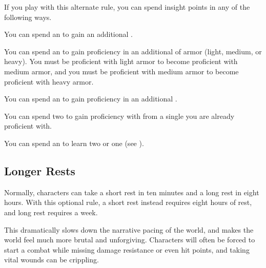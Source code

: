        If you play with this alternate rule, you can spend insight points in any of the following ways.
        \begin{raggeditemize}
            \item You can spend an  to gain an additional .
            \item You can spend an  to gain proficiency in an additional  of armor (light, medium, or heavy).
                You must be proficient with light armor to become proficient with medium armor, and you must be proficient with medium armor to become proficient with heavy armor.
            \item You can spend an  to gain proficiency in an additional .
            \item You can spend two  to gain proficiency with  from a single  you are already proficient with.
            \item You can spend an  to learn two  or one  (see ).
        \end{raggeditemize}

    \subsection{Longer Rests}\label{Longer Rests}
        Normally, characters can take a short rest in ten minutes and a long rest in eight hours.
        With this optional rule, a short rest instead requires eight hours of rest, and long rest requires a week.

        This dramatically slows down the narrative pacing of the world, and makes the world feel much more brutal and unforgiving.
        Characters will often be forced to start a combat while missing damage resistance or even hit points, and taking vital wounds can be crippling.

